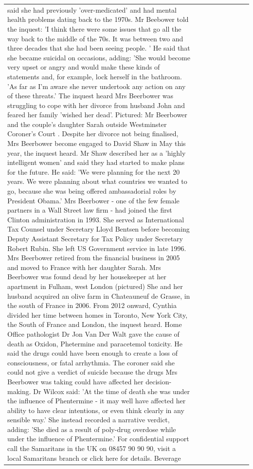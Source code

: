 \begin{table}[H]
\begin{tabular}{lllrlllll}
said she had previously 'over-medicated' and had mental health problems dating back to the 1970s. Mr Beebower told the inquest: 'I think there were some issues that go all the way back to the middle of the 70s. It was between two and three decades that she had been seeing people. ' He said that she became suicidal on occasions, adding: 'She would become very upset or angry and would make these kinds of statements and, for example, lock herself in the bathroom. 'As far as I'm aware she never undertook any action on any of these threats.' The inquest heard Mrs Beerbower was struggling to cope with her divorce from husband John and feared her family 'wished her dead'. Pictured: Mr Beerbower and the couple's daughter Sarah outside Westminster Coroner's Court . Despite her divorce not being finalised, Mrs Beerbower become engaged to David Shaw in May this year, the inquest heard. Mr Shaw described her as a 'highly intelligent women' and said they had started to make plans for the future. He said: 'We were planning for the next 20 years. We were planning about what countries we wanted to go, because she was being offered ambassadorial roles by President Obama.' Mrs Beerbower - one of the few female partners in a Wall Street law firm - had joined the first Clinton administration in 1993. She served as International Tax Counsel under Secretary Lloyd Bentsen before becoming Deputy Assistant Secretary for Tax Policy under Secretary Robert Rubin. She left US Government service in late 1996. Mrs Beerbower retired from the financial business in 2005 and moved to France with her daughter Sarah. Mrs Beerbower was found dead by her housekeeper at her apartment in Fulham, west London (pictured) She and her husband acquired an olive farm in Chateauneuf de Grasse, in the south of France in 2006. From 2012 onward, Cynthia divided her time between homes in Toronto, New York City, the South of France and London, the inquest heard. Home Office pathologist Dr Jon Van Der Walt gave the cause of death as Oxidon, Phetermine and paracetemol toxicity. He said the drugs could have been enough to create a loss of consciousness, or fatal arrhythmia. The coroner said she could not give a verdict of suicide because the drugs Mrs Beerbower was taking could have affected her decision-making. Dr Wilcox said: 'At the time of death she was under the influence of Phentermine - it may well have affected her ability to have clear intentions, or even think clearly in any sensible way.' She instead recorded a narrative verdict, adding: 'She died as a result of poly-drug overdose while under the influence of Phentermine.' For confidential support call the Samaritans in the UK on 08457 90 90 90, visit a local Samaritans branch or click here for details. Beverage \\

\end{tabular}
\end{table}
